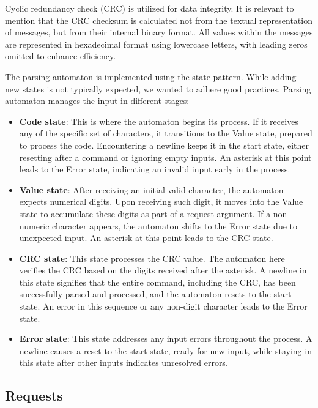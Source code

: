 Cyclic redundancy check (CRC) \cite{crc} is utilized for data integrity. It is relevant to mention that the CRC checksum is calculated not from the textual representation of messages, but from their internal binary format. All values within the messages are represented in hexadecimal format using lowercase letters, with leading zeros omitted to enhance efficiency.

The parsing automaton is implemented using the state pattern. While adding new states is not typically expected, we wanted to adhere good practices. Parsing automaton manages the input in different stages:

\begin{itemize}
    \item \textbf{Code state}: This is where the automaton begins its process. If it receives any of the specific set of characters, it transitions to the Value state, prepared to process the code. Encountering a newline keeps it in the start state, either resetting after a command or ignoring empty inputs. An asterisk at this point leads to the Error state, indicating an invalid input early in the process.
    \item \textbf{Value state}: After receiving an initial valid character, the automaton expects numerical digits. Upon receiving such digit, it moves into the Value state to accumulate these digits as part of a request argument. If a non-numeric character appears, the automaton shifts to the Error state due to unexpected input. An asterisk at this point leads to the CRC state.
    \item \textbf{CRC state}: This state processes the CRC value. The automaton here verifies the CRC based on the digits received after the asterisk. A newline in this state signifies that the entire command, including the CRC, has been successfully parsed and processed, and the automaton resets to the start state. An error in this sequence or any non-digit character leads to the Error state.
    \item \textbf{Error state}: This state addresses any input errors throughout the process. A newline causes a reset to the start state, ready for new input, while staying in this state after other inputs indicates unresolved errors.
\end{itemize}

\subsection{Requests}

